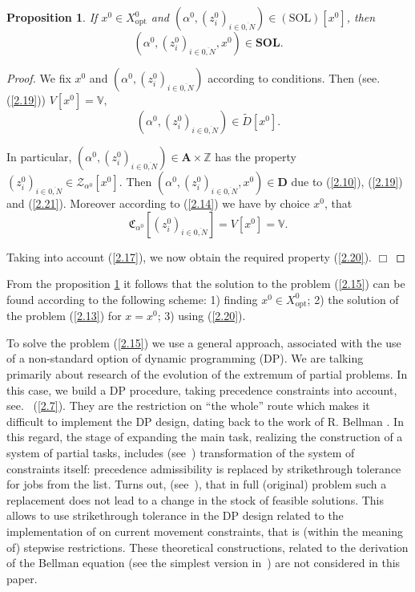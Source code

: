 \documentclass[numbers,sort&compress]{IntechOpen-Book}%
\newtheorem{proposition}{Proposition}
\begin{document}
\begin{proposition}
\label{prop:2.1}
If
$x^0 \in X^0_{\mathrm{opt}}$ and $(\alpha^0,(z_i^0)_{i \in \overline{0,N}}) \in (\mathrm{SOL})[x^0]$,
then
\begin{equation}\label{2.20}
  (\alpha^0,(z_i^0)_{i \in \overline{0,N}},x^0) \in \mathbf{SOL}.
\end{equation}
\end{proposition}

\begin{proof}

We fix
$x^0$
and
$(\alpha^0,(z_i^0)_{i \in \overline{0,N}})$
according to conditions.
Then
(see.  (\ref{2.19}))
$V[x^0] = \mathbb{V},$
\begin{equation}\label{2.21}
 (\alpha^0,(z_i^0)_{i \in \overline{0,N}}) \in \tilde{D}[x^0].
\end{equation}

In particular,
$(\alpha^0,(z_i^0)_{i \in \overline{0,N}}) \in \mathbf{A} \times \mathbb{Z}$
has the property
$(z_i^0)_{i \in \overline{0,N}} \in \mathcal{Z}_{\alpha^0}[x^0]$.
Then
$(\alpha^0,(z_i^0)_{i \in \overline{0,N}},x^0) \in \mathbf{D}$
due to
 (\ref{2.10}),  (\ref{2.19}) and  (\ref{2.21}).
Moreover according to
 (\ref{2.14})
we have by choice
$x^0$,
that
$$
  \mathfrak{C}_{\alpha^0}[(z_i^0)_{i \in \overline{0,N}}] = V[x^0] = \mathbb{V}.
$$

Taking into account
 (\ref{2.17}),
we now obtain the required property
(\ref{2.20}).
\hfill $\Box$
\end{proof}

From the proposition
\ref{prop:2.1}
it follows that
the solution to the problem
 (\ref{2.15})
can be found according to the following scheme:
1) finding $ x ^ 0 \in X ^ 0 _ {\mathrm{opt}}$;
2) the solution of the problem  (\ref{2.13}) for $ x = x ^ 0$;
3) using  (\ref{2.20}).

To solve the problem
 (\ref{2.15})
we use a general approach,
associated with the use of a non-standard option of
dynamic programming
(DP).
We are talking primarily about research of
the evolution of the extremum of partial problems.
In this case, we build a DP procedure,
taking precedence constraints into account,
see.~ (\ref{2.7}).
They are the restriction on
``the whole''
route
which makes it difficult to implement the DP design,
dating back to the work of R. Bellman
\cite{11}.
In this regard,
the stage of expanding the main task,
realizing the construction of a system of partial tasks,
includes
(see~\cite[part 2]{14})
transformation of the system
of constraints itself:
precedence admissibility
is replaced by strikethrough tolerance
for jobs from the list.
Turns out,
(see~\cite[Theorem 2.2.1]{14}),
that in full
(original)
problem
such a replacement does not lead to
a change in the stock of feasible solutions.
This allows to use
strikethrough tolerance
in the DP design
related to the implementation of on current movement constraints,
that is
(within the meaning of)
stepwise restrictions.
These theoretical constructions,
related to the derivation of the Bellman equation
(see the simplest version in~\cite[part 3]{14})
are not considered
in this paper.
\end{document}
